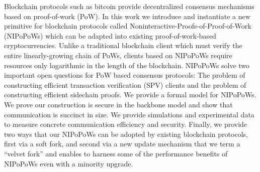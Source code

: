 Blockchain protocols such as bitcoin provide decentralized consensus mechanisms
based on proof-of-work (PoW). In this work we introduce and instantiate a new
primitive for blockchain protocols called Noninteractive-Proofs-of-Proof-of-Work
(NIPoPoWs) which can be adapted into existing proof-of-work-based
cryptocurrencies. Unlike a traditional blockchain client which must verify the
entire linearly-growing chain of PoWs, clients based on NIPoPoWs require
resources only logarithmic in the length of the blockchain. NIPoPoWs solve two
important open questions for PoW based consensus protocols: The problem of
constructing efficient transaction verification (SPV) clients and the problem
of constructing efficient sidechain proofs. We provide a formal model for
NIPoPoWs. We prove our construction is secure in the backbone model and show
that communication is succinct in size. We provide simulations and
experimental data to measure concrete communication efficiency and security.
Finally, we provide two ways that our NIPoPoWs can be adopted by existing
blockchain protocols, first via a soft fork, and second via a new update
mechanism that we term a ``velvet fork'' and enables to harness some of the
performance benefits of NIPoPoWs even with a minority upgrade.
